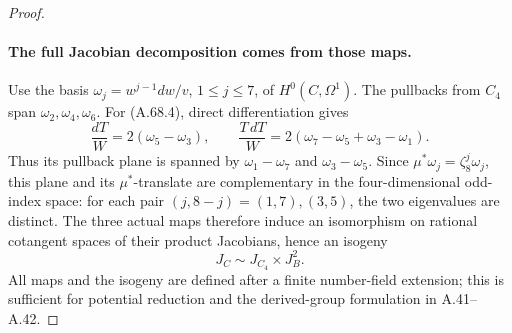 \begin{proof}
\paragraph{The full Jacobian decomposition comes from those maps.}
Use the basis
\(\omega_j=w^{j-1}dw/v\), \(1\le j\le7\), of
\(H^0(C,\Omega^1)\). The pullbacks from \(C_4\) span
\(\omega_2,\omega_4,\omega_6\). For (A.68.4), direct differentiation gives
\[
 \frac{dT}{W}=2(\omega_5-\omega_3),\qquad
 \frac{T\,dT}{W}=2(\omega_7-\omega_5+\omega_3-\omega_1).
                                                               \tag{A.68.5}
\]
Thus its pullback plane is spanned by
\(\omega_1-\omega_7\) and \(\omega_3-\omega_5\).
Since \(\mu^*\omega_j=\zeta_8^j\omega_j\), this plane and its
\(\mu^*\)-translate are complementary in the four-dimensional
odd-index space: for each pair \((j,8-j)=(1,7),(3,5)\),
the two eigenvalues are distinct. The three actual maps therefore
induce an isomorphism on rational cotangent spaces of their product
Jacobians, hence an isogeny
\[
                       J_C\sim J_{C_4}\times J_B^2.            \tag{A.68.6}
\]
All maps and the isogeny are defined after a finite number-field
extension; this is sufficient for potential reduction and the
derived-group formulation in A.41--A.42.


\end{proof}
